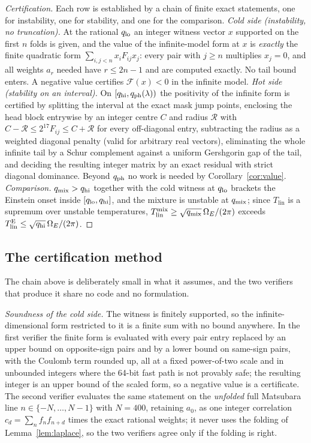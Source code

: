 \documentclass[11pt]{article}
\newcommand{\Tlin}{T_{\mathrm{lin}}}
\newcommand{\OmE}{\Omega_E}
\newcommand{\Fcal}{\mathcal F}
\theoremstyle{definition}
\theoremstyle{remark}
\begin{document}
\begin{proof}[Certification]
Each row is established by a chain of finite exact statements, one for instability, one
for stability, and one for the comparison.
\emph{Cold side (instability, no truncation).} At the rational $q_{\rm lo}$ an integer
witness vector $x$ supported on the first $n$ folds is given, and the value of the
infinite-model form at $x$ is \emph{exactly} the finite quadratic form
$\sum_{i,j<n}x_iF_{ij}x_j$: every pair with $j\ge n$ multiplies $x_j=0$, and all weights
$a_r$ needed have $r\le2n-1$ and are computed exactly. No tail bound enters. A negative
value certifies $\Fcal(x)<0$ in the infinite model.
\emph{Hot side (stability on an interval).} On $[q_{\rm hi},q_{\rm ph}(\lambda))$ the
positivity of the infinite form is certified by splitting the interval at the exact mask
jump points, enclosing the head block entrywise by an integer centre $C$ and radius
$\mathcal R$ with $C-\mathcal R\le 2^{17}F_{ij}\le C+\mathcal R$ for every off-diagonal
entry, subtracting the radius as a weighted diagonal penalty (valid for arbitrary real
vectors), eliminating the whole infinite tail by a Schur complement against a uniform
Gershgorin gap of the tail, and deciding the resulting integer matrix by an exact residual
with strict diagonal dominance. Beyond $q_{\rm ph}$ no work is needed by
Corollary~\ref{cor:value}. \emph{Comparison.} $q_{\rm mix}>q_{\rm hi}$ together with the
cold witness at $q_{\rm lo}$ brackets the Einstein onset inside $[q_{\rm lo},q_{\rm hi}]$,
and the mixture is unstable at $q_{\rm mix}$; since $\Tlin$ is a supremum over unstable
temperatures, $\Tlin^{\rm mix}\ge\sqrt{q_{\rm mix}}\,\OmE/(2\pi)$ exceeds
$\Tlin^{\rm E}\le\sqrt{q_{\rm hi}}\,\OmE/(2\pi)$.
\end{proof}

\subsection{The certification method}

The chain above is deliberately small in what it assumes, and the two verifiers that
produce it share no code and no formulation.

\emph{Soundness of the cold side.} The witness is finitely supported, so the
infinite-dimensional form restricted to it is a finite sum with no bound anywhere. In the
first verifier the finite form is evaluated with every pair entry replaced by an upper
bound on opposite-sign pairs and by a lower bound on same-sign pairs, with the Coulomb
term rounded up, all at a fixed power-of-two scale and in unbounded integers where the
64-bit fast path is not provably safe; the resulting integer is an upper bound of the
scaled form, so a negative value is a certificate. The second verifier evaluates the same
statement on the \emph{unfolded} full Matsubara line $n\in\{-N,\dots,N-1\}$ with $N=400$,
retaining $a_0$, as one integer correlation $c_d=\sum_nf_nf_{n+d}$ times the exact rational
weights; it never uses the folding of Lemma~\ref{lem:laplace}, so the two verifiers agree
only if the folding is right.
\end{document}
